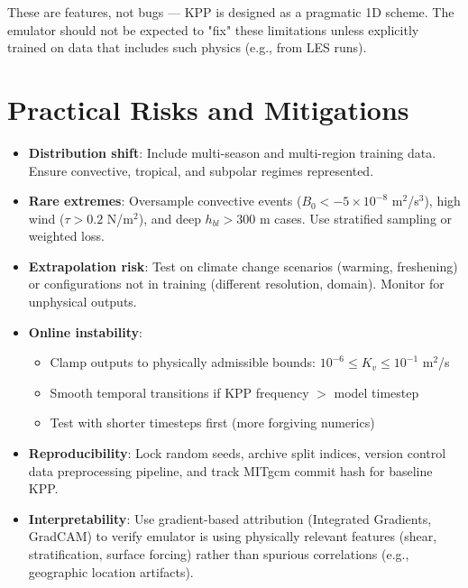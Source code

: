 \documentclass[11pt, a4paper]{article}
\begin{document}
These are features, not bugs — KPP is designed as a pragmatic 1D scheme. The emulator should not be expected to "fix" these limitations unless explicitly trained on data that includes such physics (e.g., from LES runs).

\section{Practical Risks and Mitigations}

\begin{itemize}
    \item \textbf{Distribution shift}: Include multi-season and multi-region training data. Ensure convective, tropical, and subpolar regimes represented.

    \item \textbf{Rare extremes}: Oversample convective events ($B_0 < -5 \times 10^{-8}$ m$^2$/s$^3$), high wind ($\tau > 0.2$ N/m$^2$), and deep $h_{bl} > 300$ m cases. Use stratified sampling or weighted loss.

    \item \textbf{Extrapolation risk}: Test on climate change scenarios (warming, freshening) or configurations not in training (different resolution, domain). Monitor for unphysical outputs.

    \item \textbf{Online instability}:
    \begin{itemize}
        \item Clamp outputs to physically admissible bounds: $10^{-6} \leq K_v \leq 10^{-1}$ m$^2$/s
        \item Smooth temporal transitions if KPP frequency $>$ model timestep
        \item Test with shorter timesteps first (more forgiving numerics)
    \end{itemize}

    \item \textbf{Reproducibility}: Lock random seeds, archive split indices, version control data preprocessing pipeline, and track MITgcm commit hash for baseline KPP.

    \item \textbf{Interpretability}: Use gradient-based attribution (Integrated Gradients, GradCAM) to verify emulator is using physically relevant features (shear, stratification, surface forcing) rather than spurious correlations (e.g., geographic location artifacts).
\end{itemize}
\end{document}
